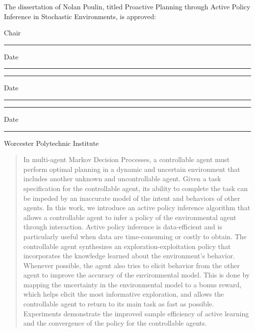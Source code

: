 \documentclass[12pt]{report}
\begin{document}
\thispagestyle{empty}

\noindent
The dissertation of Nolan Poulin, titled Proactive Planning through Active Policy Inference in Stochastic Environments, is approved:
\vfill

\vspace{0.5in}
Chair \rule{3in}{0.8pt} Date \rule{1in}{0.8pt}


\vspace{0.5in}
\hspace{0.4in} \rule{3in}{0.7pt} Date \rule{1in}{0.7pt}


\vspace{0.5in}
\hspace{0.4in} \rule{3in}{0.8pt} Date \rule{1in}{0.8pt}
\vfill
\begin{center}
	Worcester Polytechnic Institute
\end{center}

\newpage

%
\doublespacing

%
\begin{abstract}
    In multi-agent Markov Decision Processes, a controllable agent must perform optimal planning in a dynamic and
    uncertain environment that includes another unknown and uncontrollable agent.  Given a task specification for the
    controllable agent, its ability to complete the task can be impeded by an inaccurate model of the intent and
    behaviors of other agents. In this work, we introduce an active policy inference algorithm that allows a
    controllable agent to infer a policy of the environmental agent through interaction. Active policy inference is
    data-efficient and is particularly useful when data are time-consuming or costly to obtain. The controllable agent
    synthesizes an exploration-exploitation policy that incorporates the knowledge learned about the environment's
    behavior. Whenever possible, the agent also tries to elicit behavior from the other agent to improve the accuracy of
    the environmental model.  This is done by mapping the uncertainty in the environmental model to a bonus reward,
    which helps elicit the most informative exploration, and allows the controllable agent to return to its main task as
    fast as possible.  Experiments demonstrate the improved sample efficiency of active learning and the convergence of
    the policy for the controllable agents.
\end{abstract}
\end{document}
